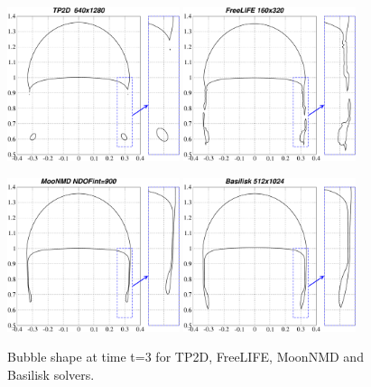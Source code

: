 \documentclass[review]{elsarticle}
\begin{document}
\begin{figure}[!h]
\begin{center}
 \includegraphics[width=0.45\textwidth]{figures/bubble_shape_t=3_TP2D.pdf}
 \hspace{4mm}
 \includegraphics[width=0.45\textwidth]{figures/bubble_shape_t=3_FreeLIFE.pdf}

 \vspace{2mm}

 \includegraphics[width=0.45\textwidth]{figures/bubble_shape_t=3_MoonNMD.pdf}
 \hspace{4mm}
 \includegraphics[width=0.45\textwidth]{figures/bubble_shape_t=3_Basilisk.pdf}
 
 \vspace{-6mm}
\end{center}
\caption{Bubble shape at time t=3 for TP2D, FreeLIFE, MoonNMD and Basilisk solvers.}
\label{fig:HB_bubble_shape_3_others}
\end{figure}
\end{document}
